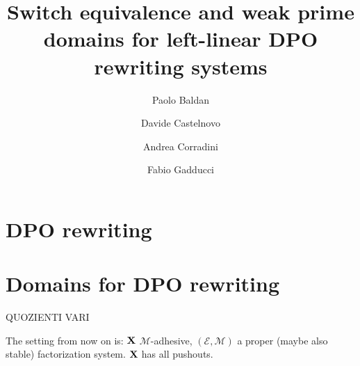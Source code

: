 \documentclass[a4paper,twoside]{report}
\title{Switch equivalence and weak prime domains for left-linear DPO rewriting systems}
\author{Paolo Baldan\and Davide Castelnovo\and  Andrea Corradini\and Fabio Gadducci}
\def\X{\textbf {\textup{X}}}
\theoremstyle{definition}
\begin{document}
\maketitle
\setcounter{tocdepth}{3}
\tableofcontents




\part{DPO rewriting}







\part{Domains for DPO rewriting}





\iffalse 
\newpage
QUOZIENTI VARI

The setting from now on is: $\X$ $\mathcal{M}$-adhesive, $(\mathcal{E}, \mathcal{M})$ a proper (maybe also stable) factorization system. $\X$ has all pushouts.
\end{document}
